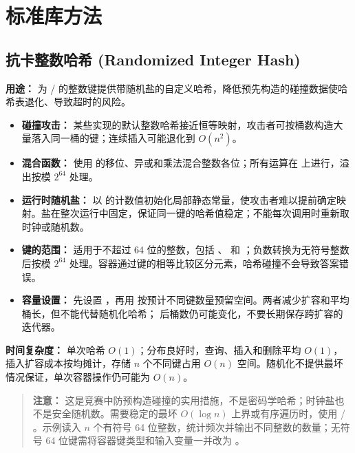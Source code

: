 \section{标准库方法}

\subsection{抗卡整数哈希 (Randomized Integer Hash)}

\textbf{用途：} 为  /  的整数键提供带随机盐的自定义哈希，降低预先构造的碰撞数据使哈希表退化、导致超时的风险。

\begin{itemize}
  \item \textbf{碰撞攻击：} 某些实现的默认整数哈希接近恒等映射，攻击者可按桶数构造大量落入同一桶的键；连续插入可能退化到 $O(n^2)$。
  \item \textbf{混合函数：} 使用  的移位、异或和乘法混合整数各位；所有运算在  上进行，溢出按模 $2^{64}$ 处理。
  \item \textbf{运行时随机盐：} 以  的计数值初始化局部静态常量，使攻击者难以提前确定映射。盐在整次运行中固定，保证同一键的哈希值稳定；不能每次调用时重新取时钟或随机数。
  \item \textbf{键的范围：} 适用于不超过 64 位的整数，包括 、 和 ；负数转换为无符号整数后按模 $2^{64}$ 处理。容器通过键的相等比较区分元素，哈希碰撞不会导致答案错误。
  \item \textbf{容量设置：} 先设置 ，再用  按预计不同键数量预留空间。两者减少扩容和平均桶长，但不能代替随机化哈希； 后桶数仍可能变化，不要长期保存跨扩容的迭代器。
\end{itemize}

\textbf{时间复杂度：} 单次哈希 $O(1)$；分布良好时，查询、插入和删除平均 $O(1)$，插入扩容成本按均摊计，存储 $n$ 个不同键占用 $O(n)$ 空间。随机化不提供最坏情况保证，单次容器操作仍可能为 $O(n)$。

\begin{quote}
  \textbf{注意：} 这是竞赛中防预构造碰撞的实用措施，不是密码学哈希；时钟盐也不是安全随机数。需要稳定的最坏 $O(\log n)$ 上界或有序遍历时，使用  / 。示例读入 $n$ 个有符号 64 位整数，统计频次并输出不同整数的数量；无符号 64 位键需将容器键类型和输入变量一并改为 。
\end{quote}



